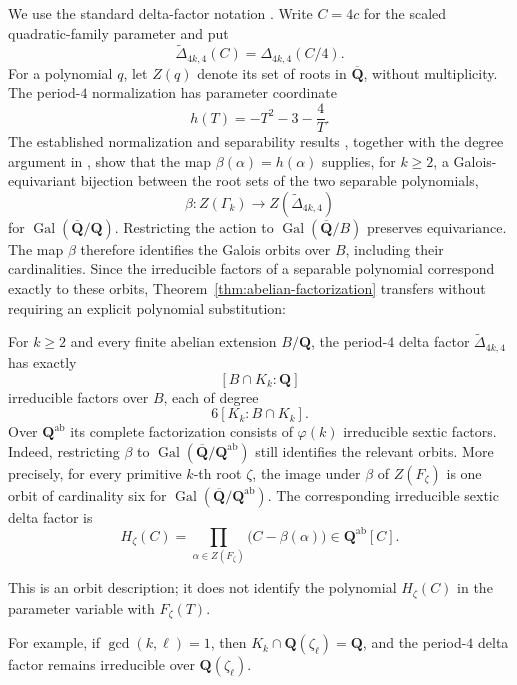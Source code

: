 We use the standard delta-factor notation
\cite{Morton1996,MortonVivaldi1995,KoizumiMurakamiSanoTakehira2025}.
Write $C=4c$ for the scaled quadratic-family parameter and put
\[
 \widetilde\Delta_{4k,4}(C)=\Delta_{4k,4}(C/4).
\]
For a polynomial $q$, let $Z(q)$ denote its set of roots in
$\overline{\mathbf Q}$, without multiplicity.  The period-$4$
normalization has parameter coordinate
\[
 h(T)=-T^2-3-\frac4T.
\]
The established normalization and separability results
\cite[Proposition 2.3, Equation (2.2), and Remark 2.10]
{KoizumiMurakamiSanoTakehira2025}, together with the degree argument in
\cite{WeiPeriod4}, show that the map $\beta(\alpha)=h(\alpha)$ supplies,
for $k\ge2$, a Galois-equivariant bijection between the root sets of
the two separable polynomials,
\[
 \beta:Z(\Gamma_k)\longrightarrow
 Z(\widetilde\Delta_{4k,4})
\]
for $\operatorname{Gal}(\overline{\mathbf Q}/\mathbf Q)$.  Restricting the
action to $\operatorname{Gal}(\overline{\mathbf Q}/B)$ preserves
equivariance.  The map $\beta$ therefore identifies the Galois orbits
over $B$, including their cardinalities.  Since the irreducible factors
of a separable polynomial correspond exactly to these orbits,
Theorem~\ref{thm:abelian-factorization} transfers without requiring an
explicit polynomial substitution:
\begin{theorem}\label{thm:delta-abelian-factorization}
For $k\ge2$ and every finite abelian extension $B/\mathbf Q$, the
period-$4$ delta factor $\widetilde\Delta_{4k,4}$ has exactly
\[
 [B\cap K_k:\mathbf Q]
\]
irreducible factors over $B$, each of degree
\[
 6[K_k:B\cap K_k].
\]
Over $\mathbf Q^{\mathrm{ab}}$ its complete factorization consists of
$\varphi(k)$ irreducible sextic factors.  Indeed, restricting $\beta$ to
$\operatorname{Gal}(\overline{\mathbf Q}/\mathbf Q^{\mathrm{ab}})$ still
identifies the relevant orbits.  More precisely, for every
primitive $k$-th root $\zeta$, the image under $\beta$ of
$Z(F_\zeta)$ is one orbit of cardinality six for
$\operatorname{Gal}(\overline{\mathbf Q}/\mathbf Q^{\mathrm{ab}})$.
The corresponding irreducible sextic delta factor is
\[
 H_\zeta(C)=\prod_{\alpha\in Z(F_\zeta)}
 \bigl(C-\beta(\alpha)\bigr)
 \in\mathbf Q^{\mathrm{ab}}[C].
\]
\end{theorem}

\begin{remark}
This is an orbit description; it does not identify the polynomial
$H_\zeta(C)$ in the parameter variable with $F_\zeta(T)$.
\end{remark}

For example, if $\gcd(k,\ell)=1$, then
$K_k\cap\mathbf Q(\zeta_\ell)=\mathbf Q$, and the period-$4$ delta
factor remains irreducible over $\mathbf Q(\zeta_\ell)$.

